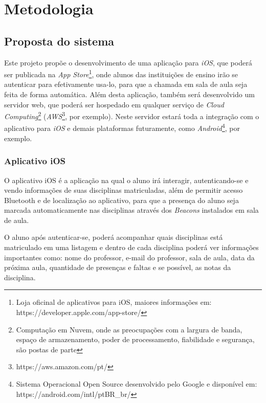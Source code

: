 \documentclass[
	12pt,
	oneside,
	a4paper,
	english,
	brazil,
]{abntex2}
\begin{document}

\chapter{Metodologia}
\section{Proposta do sistema}

Este projeto propõe o desenvolvimento de uma aplicação para \emph{iOS}, que poderá ser publicada na \emph{App Store}\footnote{Loja oficinal de aplicativos para iOS, maiores informações em: https://developer.apple.com/app-store/}, onde alunos das instituições de ensino irão se autenticar para efetivamente usa-lo, para que a chamada em sala de aula seja feita de forma automática. Além desta aplicação, também será desenvolvido um servidor web, que poderá ser hospedado em qualquer serviço de \emph{Cloud Computing}\footnote{Computação em Nuvem, onde as preocupações com a largura de banda, espaço de armazenamento, poder de processamento, fiabilidade e segurança, são postas de parte\cite{cloud-computing-about}} (\emph{AWS}\footnote{https://aws.amazon.com/pt/}, por exemplo). Neste servidor estará toda a integração com o aplicativo para \emph{iOS} e demais plataformas futuramente, como \emph{Android}\footnote{Sistema Operacional Open Source desenvolvido pelo Google e disponível em: https://android.com/intl/pt\-BR\_br/}, por exemplo.

\subsection{Aplicativo iOS}

O aplicativo iOS é a aplicação na qual o aluno irá interagir, autenticando-se e vendo informações de suas disciplinas matriculadas, além de permitir acesso Bluetooth e de localização ao aplicativo, para que a presença do aluno seja marcada automaticamente nas disciplinas através dos \emph{Beacons} instalados em sala de aula.

O aluno após autenticar-se, poderá acompanhar quais disciplinas está matriculado em uma listagem e dentro de cada disciplina poderá ver informações importantes como: nome do professor, e-mail do professor, sala de aula, data da próxima aula, quantidade de presenças e faltas e se possível, as notas da disciplina.
\end{document}
